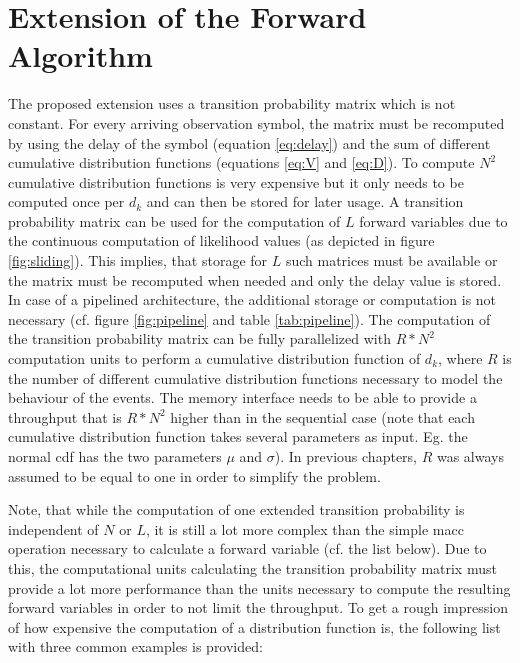 \documentclass[mscthesis]{usiinfthesis}
\begin{document}
\section{Extension of the Forward Algorithm}
\label{ch:analysis_extension}

The proposed extension uses a transition probability matrix which is not
constant. For every arriving observation symbol, the matrix must be recomputed
by using the delay of the symbol (equation \ref{eq:delay}) and the sum of
different cumulative distribution functions (equations \ref{eq:V} and
\ref{eq:D}). To compute $N^2$ cumulative distribution functions is very
expensive but it only needs to be computed once per $d_k$ and can then be
stored for later usage.  A transition probability matrix can be used for the
computation of $L$ forward variables due to the continuous computation of
likelihood values (as depicted in figure \ref{fig:sliding}). This implies, that
storage for $L$ such matrices must be available or the matrix must be
recomputed when needed and only the delay value is stored. In case of
a pipelined architecture, the additional storage or computation is not
necessary (cf. figure \ref{fig:pipeline} and table \ref{tab:pipeline}). The
computation of the transition probability matrix can be fully parallelized with
$R*N^2$ computation units to perform a cumulative distribution function of
$d_k$, where $R$ is the number of different cumulative distribution functions
necessary to model the behaviour of the events. The memory interface needs to
be able to provide a throughput that is $R*N^2$ higher than in the sequential
case (note that each cumulative distribution function takes several parameters
as input. Eg. the normal \gls{cdf} has the two parameters $\mu$ and $\sigma$). In
previous chapters, $R$ was always assumed to be equal to one in order to
simplify the problem.

Note, that while the computation of one extended transition probability is
independent of $N$ or $L$, it is still a lot more complex than the simple
\gls{macc} operation necessary to calculate a forward variable (cf.
the list below). Due to this, the computational units calculating the
transition probability matrix must provide a lot more performance than the
units necessary to compute the resulting forward variables in order to not
limit the throughput. To get a rough impression of how expensive the
computation of a distribution function is, the following list with three common
examples is provided:
\end{document}
